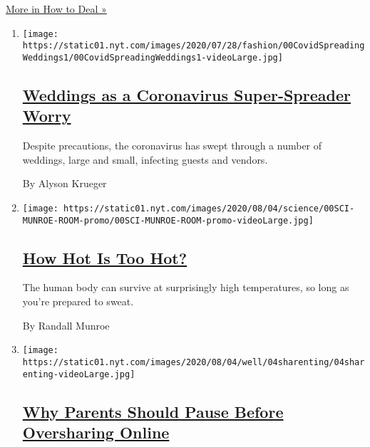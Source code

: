 \href{/spotlight/how-to-deal}{More in How to Deal »}

\begin{enumerate}
\def\labelenumi{\arabic{enumi}.}
\item
  \texttt{[image: https://static01.nyt.com/images/2020/07/28/fashion/00CovidSpreadingWeddings1/00CovidSpreadingWeddings1-videoLarge.jpg]}

  \hypertarget{weddings-as-a-coronavirus-super-spreader-worry}{%
  \subsection{\texorpdfstring{\href{/2020/08/04/fashion/weddings/weddings-as-covid-super-spreaders.html}{Weddings
  as a Coronavirus Super-Spreader
  Worry}}{Weddings as a Coronavirus Super-Spreader Worry}}\label{weddings-as-a-coronavirus-super-spreader-worry}}

  Despite precautions, the coronavirus has swept through a number of
  weddings, large and small, infecting guests and vendors.

  By Alyson Krueger
\item
  \texttt{[image: https://static01.nyt.com/images/2020/08/04/science/00SCI-MUNROE-ROOM-promo/00SCI-MUNROE-ROOM-promo-videoLarge.jpg]}

  \hypertarget{how-hot-is-too-hot}{%
  \subsection{\texorpdfstring{\href{/2020/08/04/science/randall-munroe-xkcd-temperature.html}{How
  Hot Is Too Hot?}}{How Hot Is Too Hot?}}\label{how-hot-is-too-hot}}

  The human body can survive at surprisingly high temperatures, so long
  as you're prepared to sweat.

  By Randall Munroe
\item
  \texttt{[image: https://static01.nyt.com/images/2020/08/04/well/04sharenting/04sharenting-videoLarge.jpg]}

  \hypertarget{why-parents-should-pause-before-oversharing-online}{%
  \subsection{\texorpdfstring{\href{/2020/08/04/well/family/parents-social-media-privacy.html}{Why
  Parents Should Pause Before Oversharing
  Online}}{Why Parents Should Pause Before Oversharing Online}}\label{why-parents-should-pause-before-oversharing-online}}


\end{enumerate}
